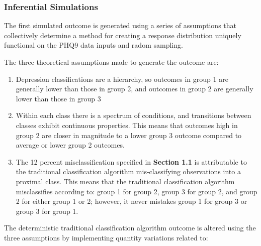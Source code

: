 \documentclass[12pt,]{article}
\providecommand{\tightlist}{%
  \setlength{\itemsep}{0pt}\setlength{\parskip}{0pt}}
\begin{document}
\hypertarget{inferential-simulations}{%
\subsubsection{Inferential Simulations}\label{inferential-simulations}}

The first simulated outcome is generated using a series of assumptions
that collectively determine a method for creating a response
distribution uniquely functional on the PHQ9 data inputs and radom
sampling.

The three theoretical assumptions made to generate the outcome are:

\begin{enumerate}
\def\labelenumi{\arabic{enumi}.}
\tightlist
\item
  Depression classifications are a hierarchy, so outcomes in group 1 are
  generally lower than those in group 2, and outcomes in group 2 are
  generally lower than those in group 3
\item
  Within each class there is a spectrum of conditions, and transitions
  between classes exhibit continuous properties. This means that
  outcomes high in group 2 are closer in magnitude to a lower group 3
  outcome compared to average or lower group 2 outcomes.
\item
  The 12 percent misclassification specified in \textbf{Section 1.1} is
  attributable to the traditional classification algorithm
  mis-classifying observations into a proximal class. This means that
  the traditional classification algorithm misclassifies according to:
  group 1 for group 2, group 3 for group 2, and group 2 for either group
  1 or 2; however, it never mistakes group 1 for group 3 or group 3 for
  group 1.
\end{enumerate}

The deterministic traditional classification algorithm outcome is
altered using the three assumptions by implementing quantity variations
related to:
\end{document}
